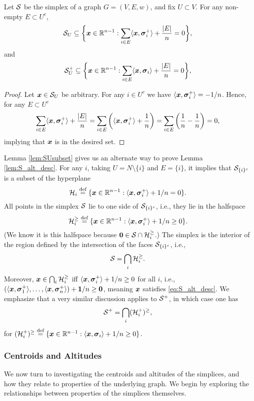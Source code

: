 \begin{lemma}
\label{lem:SUsubset}
Let $\mathcal{S}$ be the simplex of a graph $G=(V,E,w)$, and fix $U\subset V$. For any non-empty $E\subset U^c$,
\begin{equation*}
    \mathcal{S}_U \subseteq \bigg\{\vb*{x}\in\mathbb{R}^{n-1}: \sum_{i\in E}\langle \vb*{x},\vb*{\sigma}_i^+\rangle +\frac{|E|}{n}=  0\bigg\},
\end{equation*}
and
\begin{equation*}
    \mathcal{S}^+_U \subseteq \bigg\{\vb*{x}\in\mathbb{R}^{n-1}: \sum_{i\in E}\langle \vb*{x},\vb*{\sigma}_i\rangle +\frac{|E|}{n}=  0\bigg\},
\end{equation*}
\end{lemma}
\begin{proof}
Let $\vb*{x}\in\mathcal{S}_U$ be arbitrary. For any $i\in U^c$ we have $\langle \vb*{x},\vb*{\sigma}_i^+\rangle = -1/n$. Hence, for any $E\subset U^c$
\[\sum_{i\in E}\langle \vb*{x},\vb*{\sigma}_i^+\rangle + \frac{|E|}{n} = \sum_{i\in E}\bigg(\langle \vb*{x},\vb*{\sigma}_i^+\rangle+\frac{1}{n}\bigg)=\sum_{i\in E}\bigg(\frac{1}{n}-\frac{1}{n}\bigg)=0,\]
implying that $\vb*{x}$ is in the desired set. 
\end{proof}

Lemma \ref{lem:SUsubset} gives us an alternate way to prove Lemma \ref{lem:S_alt_desc}. For any $i$,  taking $U=N\setminus \{i\}$ and $E=\{i\}$, it implies that $\mathcal{S}_{\{i\}^c}$ is a subset of the hyperplane 
\[ \mathcal{H}_i\overset{\text{def}}{=} \{\vb*{x}\in\mathbb{R}^{n-1}:\langle \vb*{x},\vb*{\sigma}_i^+\rangle+1/n=0\}.\]
All points in the simplex $\mathcal{S}$ lie to one side of $\mathcal{S}_{\{i\}^c}$, i.e., they lie in the halfspace 
\[\mathcal{H}_i^{\geq } \overset{\text{def}}{=} \{\vb*{x}\in\mathbb{R}^{n-1}:\langle \vb*{x},\vb*{\sigma}_i^+\rangle+1/n\geq0\}.\]
(We know it is this halfspace because $\vb{0}\in\mathcal{S}\cap\mathcal{H}_i^{\geq }$.) The simplex is the interior of the region defined by the intersection of the faces $\mathcal{S}_{\{i\}^c}$, i.e.,   
\begin{equation}
\label{eq:splx_bigcapH_i}
    \mathcal{S}=\bigcap_i \mathcal{H}_i^{\geq }.
\end{equation}
Moreover, $\vb*{x}\in \bigcap_i\mathcal{H}_i^{\geq }$ iff $\langle \vb*{x},\vb*{\sigma}_i^+\rangle +1/n\geq 0$ for all $i$, i.e., $(\langle \vb*{x},\vb*{\sigma}_1^+\rangle,\dots,\langle \vb*{x},\vb*{\sigma}_n^+\rangle) + \vb{1}/n\geq \vb{0}$, meaning $\vb*{x}$ satisfies \eqref{eq:S_alt_desc}.  We emphasize that a very similar discussion applies to $\mathcal{S}^+$, in which case one has 
\begin{equation}
\label{eq:splx^+_bigcapH_i}
\mathcal{S}^+=\bigcap_i (\mathcal{H}_i^+)^{\geq },
\end{equation}
for $(\mathcal{H}_i^+)^{\geq } \overset{\text{def}}{=} \{\vb*{x}\in\mathbb{R}^{n-1}:\langle \vb*{x},\vb*{\sigma}_i\rangle + 1/n\geq 0\}$. 


\subsubsection{Centroids and Altitudes} 
We now turn to investigating the centroids and altitudes of the simplices, and how they relate to properties of the underlying graph. We begin by exploring the relationships between properties of the simplices themselves. 


